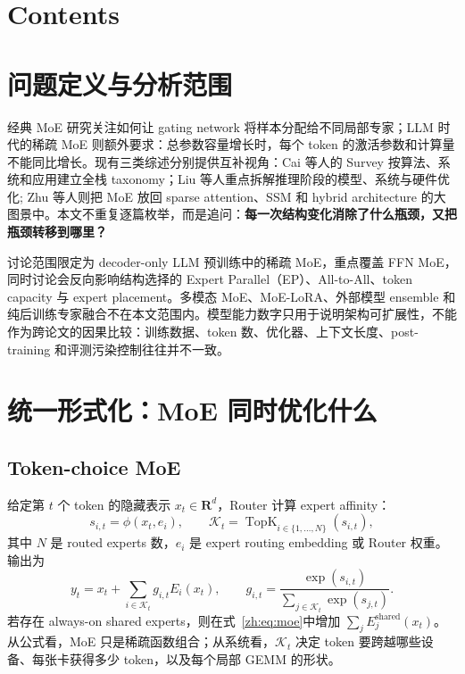 \documentclass[10pt,a4paper,fontset=none]{ctexart}
\makeatletter
\renewcommand{\contentsname}{Contents}
\def\BilingualTocExtension{entoc}
\renewcommand{\tableofcontents}{%
  \section*{\contentsname
    \@mkboth{\MakeUppercase\contentsname}{\MakeUppercase\contentsname}}%
  \@starttoc{\BilingualTocExtension}%
}
\makeatother
\begin{document}
\clearpage
\begingroup
\small
\setlength{\parskip}{0pt}
\linespread{1.02}\selectfont
\setcounter{tocdepth}{2}
\tableofcontents
\endgroup
\clearpage

\section{问题定义与分析范围}

经典 MoE 研究关注如何让 gating network 将样本分配给不同局部专家；LLM 时代的稀疏 MoE 则额外要求：总参数容量增长时，每个 token 的激活参数和计算量不能同比增长。现有三类综述分别提供互补视角：Cai 等人的 Survey 按算法、系统和应用建立全栈 taxonomy\cite{zh:cai2024survey}；Liu 等人重点拆解推理阶段的模型、系统与硬件优化\cite{zh:liu2024inference}; Zhu 等人则把 MoE 放回 sparse attention、SSM 和 hybrid architecture 的大图景中\cite{zh:zhu2025speed}。本文不重复逐篇枚举，而是追问：\textbf{每一次结构变化消除了什么瓶颈，又把瓶颈转移到哪里？}

讨论范围限定为 decoder-only LLM 预训练中的稀疏 MoE，重点覆盖 FFN MoE，同时讨论会反向影响结构选择的 Expert Parallel（EP）、All-to-All、token capacity 与 expert placement。多模态 MoE、MoE-LoRA、外部模型 ensemble 和纯后训练专家融合不在本文范围内。模型能力数字只用于说明架构可扩展性，不能作为跨论文的因果比较：训练数据、token 数、优化器、上下文长度、post-training 和评测污染控制往往并不一致。

\section{统一形式化：MoE 同时优化什么}

\subsection{Token-choice MoE}

给定第 $t$ 个 token 的隐藏表示 $x_t\in\mathbf{R}^{d}$，Router 计算 expert affinity：
\begin{equation}
  s_{i,t}=\phi(x_t,e_i),\qquad
  \mathcal{K}_t=\operatorname{TopK}_{i\in\{1,\ldots,N\}}(s_{i,t}),
  \label{zh:eq:router}
\end{equation}
其中 $N$ 是 routed experts 数，$e_i$ 是 expert routing embedding 或 Router 权重。输出为
\begin{equation}
  y_t=x_t+\sum_{i\in\mathcal{K}_t}g_{i,t}E_i(x_t),
  \qquad
  g_{i,t}=\frac{\exp(s_{i,t})}{\sum_{j\in\mathcal{K}_t}\exp(s_{j,t})}.
  \label{zh:eq:moe}
\end{equation}
若存在 always-on shared experts，则在式~\eqref{zh:eq:moe}中增加 $\sum_j E^{\mathrm{shared}}_j(x_t)$。从公式看，MoE 只是稀疏函数组合；从系统看，$\mathcal{K}_t$ 决定 token 要跨越哪些设备、每张卡获得多少 token，以及每个局部 GEMM 的形状。
\end{document}

